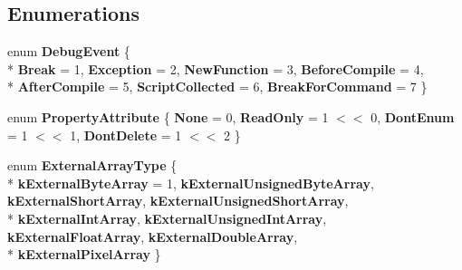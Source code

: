 \subsection*{Enumerations}
\begin{DoxyCompactItemize}
\item 
\hypertarget{namespacev8_a4157e857c3767e2b82686a53ae3da853}{}enum {\bfseries Debug\+Event} \{ \\*
{\bfseries Break} = 1, 
{\bfseries Exception} = 2, 
{\bfseries New\+Function} = 3, 
{\bfseries Before\+Compile} = 4, 
\\*
{\bfseries After\+Compile} = 5, 
{\bfseries Script\+Collected} = 6, 
{\bfseries Break\+For\+Command} = 7
 \}\label{namespacev8_a4157e857c3767e2b82686a53ae3da853}

\item 
\hypertarget{namespacev8_a05f25f935e108a1ea2d150e274602b87}{}enum {\bfseries Property\+Attribute} \{ {\bfseries None} = 0, 
{\bfseries Read\+Only} = 1 $<$$<$ 0, 
{\bfseries Dont\+Enum} = 1 $<$$<$ 1, 
{\bfseries Dont\+Delete} = 1 $<$$<$ 2
 \}\label{namespacev8_a05f25f935e108a1ea2d150e274602b87}

\item 
\hypertarget{namespacev8_aabbbc5430374565be119ff192a40544e}{}enum {\bfseries External\+Array\+Type} \{ \\*
{\bfseries k\+External\+Byte\+Array} = 1, 
{\bfseries k\+External\+Unsigned\+Byte\+Array}, 
{\bfseries k\+External\+Short\+Array}, 
{\bfseries k\+External\+Unsigned\+Short\+Array}, 
\\*
{\bfseries k\+External\+Int\+Array}, 
{\bfseries k\+External\+Unsigned\+Int\+Array}, 
{\bfseries k\+External\+Float\+Array}, 
{\bfseries k\+External\+Double\+Array}, 
\\*
{\bfseries k\+External\+Pixel\+Array}
 \}\label{namespacev8_aabbbc5430374565be119ff192a40544e}


\end{DoxyCompactItemize}
